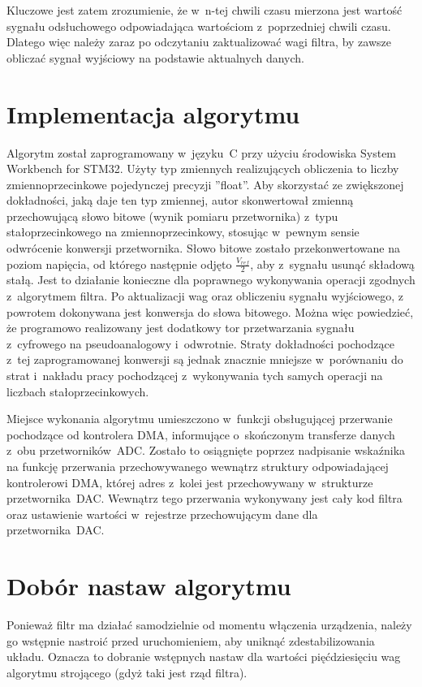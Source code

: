 Kluczowe jest zatem zrozumienie, że w~n-tej chwili czasu mierzona jest wartość sygnału odsłuchowego odpowiadająca wartościom z~poprzedniej chwili czasu. Dlatego więc należy zaraz po odczytaniu zaktualizować wagi filtra, by zawsze obliczać sygnał wyjściowy na podstawie aktualnych danych.
\section{Implementacja algorytmu}
Algorytm został zaprogramowany w~języku~C przy użyciu środowiska System Workbench for STM32. Użyty typ zmiennych realizujących obliczenia to liczby zmiennoprzecinkowe pojedynczej precyzji ''float''. Aby skorzystać ze zwiększonej dokładności, jaką daje ten typ zmiennej, autor skonwertował zmienną przechowującą słowo bitowe (wynik pomiaru przetwornika) z~typu stałoprzecinkowego na zmiennoprzecinkowy, stosując w~pewnym sensie odwrócenie konwersji przetwornika. Słowo bitowe zostało przekonwertowane na poziom napięcia, od którego następnie odjęto $ \frac{V_{ref}}{2} $, aby z~sygnału usunąć składową stałą. Jest to działanie konieczne dla poprawnego wykonywania operacji zgodnych z~algorytmem filtra. Po aktualizacji wag oraz obliczeniu sygnału wyjściowego, z powrotem dokonywana jest konwersja do słowa bitowego. Można więc powiedzieć, że programowo realizowany jest dodatkowy tor przetwarzania sygnału z~cyfrowego na pseudoanalogowy i~odwrotnie. Straty dokładności pochodzące z~tej zaprogramowanej konwersji są jednak znacznie mniejsze w~porównaniu do strat i~nakładu pracy pochodzącej z~wykonywania tych samych operacji na liczbach stałoprzecinkowych.

Miejsce wykonania algorytmu umieszczono w~funkcji obsługującej przerwanie pochodzące od kontrolera DMA, informujące o~skończonym transferze danych z~obu przetworników~ADC. Zostało to osiągnięte poprzez nadpisanie wskaźnika na funkcję przerwania przechowywanego wewnątrz struktury odpowiadającej kontrolerowi DMA, której adres z~kolei jest przechowywany w~strukturze przetwornika~DAC. Wewnątrz tego przerwania wykonywany jest cały kod filtra oraz ustawienie wartości w~rejestrze przechowującym dane dla przetwornika~DAC.
\section{Dobór nastaw algorytmu}
Ponieważ filtr ma działać samodzielnie od momentu włączenia urządzenia, należy go wstępnie nastroić przed uruchomieniem, aby uniknąć zdestabilizowania układu. Oznacza to dobranie wstępnych nastaw dla wartości pięćdziesięciu wag algorytmu strojącego (gdyż taki jest rząd filtra).